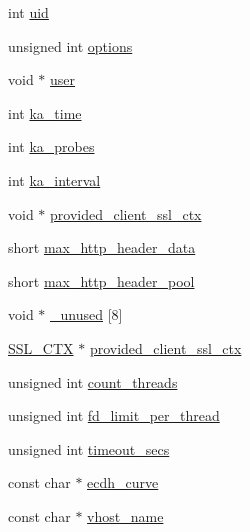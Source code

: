 \begin{DoxyCompactItemize}
int \hyperlink{structlws__context__creation__info_ac105b4180008cb3e672d57beead8382e}{uid}
\item 
unsigned int \hyperlink{structlws__context__creation__info_a9d3b17a25e1fbc772f21eb4959a82724}{options}
\item 
void $\ast$ \hyperlink{structlws__context__creation__info_a1f30f5ed4ae114f75bd976c21630c032}{user}
\item 
int \hyperlink{structlws__context__creation__info_ac583ce92b8e1c949cb6fef6bfe713d56}{ka\+\_\+time}
\item 
int \hyperlink{structlws__context__creation__info_a3baab4285c679fbe027c2504621d7410}{ka\+\_\+probes}
\item 
int \hyperlink{structlws__context__creation__info_a381342a398883d6204955ff3c1849ddd}{ka\+\_\+interval}
\item 
void $\ast$ \hyperlink{structlws__context__creation__info_a36eb10f9029ecf72498d267ee7fc6ebb}{provided\+\_\+client\+\_\+ssl\+\_\+ctx}
\item 
short \hyperlink{structlws__context__creation__info_a0cdfd3c484689ba6f0f2cc91b38ce948}{max\+\_\+http\+\_\+header\+\_\+data}
\item 
short \hyperlink{structlws__context__creation__info_a0b154e79abc1167ba4ac3539f4af6720}{max\+\_\+http\+\_\+header\+\_\+pool}
\item 
void $\ast$ \hyperlink{structlws__context__creation__info_aaae1af38a410556cc5db05e4973e8d27}{\+\_\+unused} \mbox{[}8\mbox{]}
\item 
\hyperlink{structssl__ctx__st}{S\+S\+L\+\_\+\+C\+TX} $\ast$ \hyperlink{structlws__context__creation__info_a1654d41bea6fb2f619b57e6a264b26a4}{provided\+\_\+client\+\_\+ssl\+\_\+ctx}
\item 
unsigned int \hyperlink{structlws__context__creation__info_ae52f3237e144e9ddcab5e2cf91d1e419}{count\+\_\+threads}
\item 
unsigned int \hyperlink{structlws__context__creation__info_a45e63e24c88289e0c8352377ef4d3646}{fd\+\_\+limit\+\_\+per\+\_\+thread}
\item 
unsigned int \hyperlink{structlws__context__creation__info_a6cfa3d51df2def3349a5cbf0d712822d}{timeout\+\_\+secs}
\item 
const char $\ast$ \hyperlink{structlws__context__creation__info_ad166109b7e704c8276756b2ce60d2d77}{ecdh\+\_\+curve}
\item 
const char $\ast$ \hyperlink{structlws__context__creation__info_a82d7895c929bd30d1136c9d8d790897f}{vhost\+\_\+name}
\item 

\end{DoxyCompactItemize}
